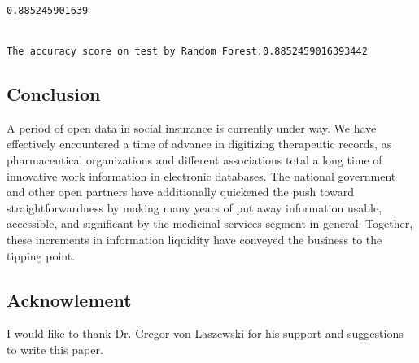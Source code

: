 \documentclass[11pt]{article}
\begin{document}
    \begin{Verbatim}[commandchars=\\\{\}]
0.885245901639


The accuracy score on test by Random Forest:0.8852459016393442

    \end{Verbatim}
    
    \maketitle
    \subsection{Conclusion}

A period of open data in social insurance is currently under way. We have effectively encountered a time of advance in digitizing therapeutic records, as pharmaceutical organizations and different associations total a long time of innovative work information in electronic databases. The national government and other open partners have additionally quickened the push toward straightforwardness by making many years of put away information usable, accessible, and significant by the medicinal services segment in general. Together, these increments in information liquidity have conveyed the business to the tipping point.



\maketitle
\subsection{Acknowlement}

  I would like to thank Dr. Gregor von Laszewski for his
  support and suggestions to write this paper.




    
    
    


    
    
    
    
\end{document}

